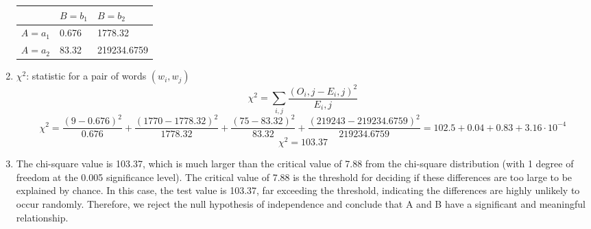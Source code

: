 \documentclass{article}
\begin{document}
\begin{enumerate}
\renewcommand{\arraystretch}{1}
	\begin{center}
	\begin{tabular} { | m{2cm} | m{2cm} | m{2cm} |  }
		\hline
		 & $B = b_1$ & $B = b_2$ \\
		\hline
		$A = a_1$ & 0.676 & 1778.32 \\
		\hline
		$A = a_2$ & 83.32 & 219234.6759 \\
		\hline
	\end{tabular}
	\end{center}
	\item $\chi^2$: statistic for a pair of words $(w_i, w_j)$
	\begin{equation*}
		\chi^2 = \sum_{i,j} \frac{(O_i,j - E_i,j)^2}{E_i,j}
	\end{equation*}
	\begin{equation*}
	\chi^2 = \frac{(9-0.676)^2}{0.676} + \frac{(1770-1778.32)^2}{1778.32} + \frac{(75-83.32)^2}{83.32} + \frac{(219243-219234.6759)^2}{219234.6759} = 102.5 + 0.04 + 0.83 + 3.16 \cdot 10^{-4}
	\end{equation*}
	\begin{equation*}
	\chi^2 = 103.37
	\end{equation*}

	\item The chi-square value is 103.37, which is much larger than the critical value of 7.88 from the chi-square distribution (with 1 degree of freedom at the 0.005 significance level). The critical value of 7.88 is the threshold for deciding if these differences are too large to be explained by chance. In this case, the test value is 103.37, far exceeding the threshold, indicating the differences are highly unlikely to occur randomly. Therefore, we reject the null hypothesis of independence and conclude that A and B have a significant and meaningful relationship.

	\end{enumerate}
\end{document}
